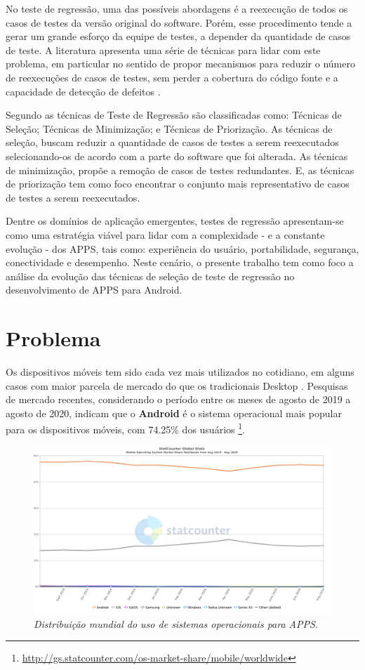 No teste de regressão, uma das possíveis abordagens é a reexecução de todos os casos de testes da versão original do software. Porém, esse procedimento tende a gerar um grande esforço da equipe de testes, a depender da quantidade de casos de teste. A literatura apresenta uma série de técnicas para lidar com este problema, em particular no sentido de propor mecanismos para reduzir o número de reexecuções de casos de testes, sem perder a cobertura do código fonte e a capacidade de detecção de defeitos  \cite{Graves:2001:ESR:367008.367020,ENGSTROM201014,KAZMI2017,ROMANO201862}.

Segundo  as técnicas de Teste de Regressão são classificadas como: Técnicas de Seleção; Técnicas de Minimização; e Técnicas de Priorização. As técnicas de seleção, buscam reduzir a quantidade de casos de testes a serem reexecutados selecionando-os de acordo com a parte do software que foi alterada. As técnicas de minimização, propõe a remoção de casos de testes redundantes. E, as técnicas de priorização tem como foco encontrar o conjunto mais representativo de casos de testes a serem reexecutados.

Dentre os domínios de aplicação emergentes, testes de regressão apresentam-se como uma estratégia viável para lidar com a complexidade - e a constante evolução - dos \ac{APPS}, tais como: experiência do usuário, portabilidade, segurança, conectividade e desempenho. Neste cenário, o presente trabalho tem como foco a análise da evolução das técnicas de seleção de teste de regressão no desenvolvimento de \ac{APPS} para Android.


\section{Problema}\label{sec:problema}

Os dispositivos móveis tem sido cada vez mais utilizados no cotidiano, em alguns casos com maior parcela de mercado do que os tradicionais Desktop \cite{Do2016RedroidAR}. Pesquisas de mercado recentes, considerando o período entre os meses de agosto de 2019 a agosto de 2020, indicam que o \textbf{Android} é o sistema operacional mais popular para os dispositivos móveis, com 74.25\% dos usuários \footnote{\url{http://gs.statcounter.com/os-market-share/mobile/worldwide}}.

\begin{figure}[!htb]
\centering
\includegraphics[width=.8\textwidth]{images/usuariosAndroid.png}
\caption{\textit{Distribuição mundial do uso de sistemas operacionais para \ac{APPS}.}}
\label{figure:usuariosAndroid}
\end{figure}


